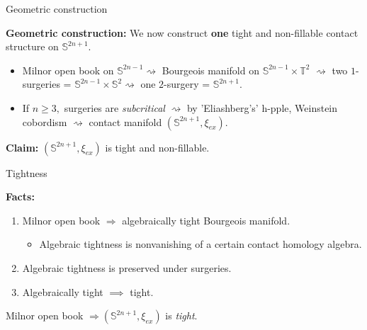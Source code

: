 \documentclass{beamer}
\begin{document}
\begin{frame}{Geometric construction}
    
    \textbf{Geometric construction:} We now construct \textbf{one} tight and non-fillable contact structure on $\mathbb S^{2n+1}$.
    
    \medskip
    
    \pause

    \begin{itemize}
        \item Milnor open book on $\mathbb S^{2n-1}\rightsquigarrow$ Bourgeois manifold on $\mathbb S^{2n-1}\times \mathbb T^2$
    $\rightsquigarrow $ two $1$-surgeries = $\mathbb S^{2n-1}\times \mathbb S^2 \rightsquigarrow$ one $2$-surgery = $\mathbb S^{2n+1}.$
    
    \medskip

    \pause
    
    \item If $n\geq 3,$ surgeries are \emph{subcritical} $\rightsquigarrow$ by 'Eliashberg's' h-pple, Weinstein cobordism $\rightsquigarrow$ contact manifold $(\mathbb S^{2n+1},\xi_{ex})$.

    \end{itemize}

    \pause
    
    \medskip

    \begin{tcolorbox}
    \textbf{Claim:} $(\mathbb S^{2n+1},\xi_{ex})$ is tight and non-fillable.
    \end{tcolorbox}
    
\end{frame}


\begin{frame}{Tightness}

    \textbf{Facts:} \begin{enumerate}
        \item Milnor open book $\Rightarrow$  algebraically tight Bourgeois manifold.
        \pause
        \begin{itemize}
            \item Algebraic tightness is nonvanishing of a certain contact homology algebra.
        \end{itemize}
        \pause
        \item Algebraic tightness is preserved under surgeries.
        \pause
        \item Algebraically tight $\implies$ tight.
    \end{enumerate}
    
    \pause
    
    \vspace*{1cm}
    
    \begin{tcolorbox}
        Milnor open book $\Rightarrow (\mathbb S^{2n+1},\xi_{ex})$ is \emph{tight}.
    \end{tcolorbox}
    
\end{frame}
\end{document}

